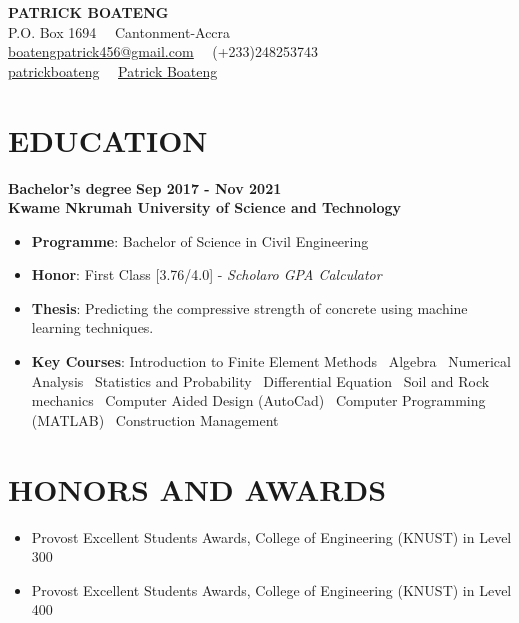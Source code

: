 \documentclass[letterpaper, 12pt]{article}
\newcommand{\cvsection}[1]{
	
	\section*{#1}
}
\newcommand{\verticalSpace}{4pt}
\newcommand{\itemizeMargin}{11pt}
\begin{document}
	
	
	\begin{center}
		
	{\huge{\textbf{PATRICK BOATENG}}} \\ [\verticalSpace]
	
	P.O. Box 1694 \, \vrule \, Cantonment-Accra \\ [\verticalSpace]
	
	\faEnvelope \space \href{mailto:boatengpatrick456@gmail.com}{\underline{boatengpatrick456@gmail.com}}
	\, \vrule \,
	\faPhone \space (+233)248253743 \\ [\verticalSpace]
	\faGithub \space \href{https://www.github.com/patrickboateng}{\underline{patrickboateng}}
	\, \vrule \,
	\faLinkedin \space \href{https://www.linkedin.com/in/patrickboateng}{\underline{Patrick Boateng}}
	
	\end{center}
	
	
	\cvsection{EDUCATION} 	
	
	\textbf{Bachelor's degree} \hfill \textbf{Sep 2017 - Nov 2021} \\ [\verticalSpace]
	\textbf{Kwame Nkrumah University of Science and Technology}
	
	\begin{itemize}[leftmargin=\itemizeMargin]
		
		\item \textbf{Programme}: Bachelor of Science in Civil Engineering
		\item \textbf{Honor}: First Class [3.76/4.0] - \textit{Scholaro GPA Calculator}
		\item \textbf{Thesis}: Predicting the compressive strength of concrete using machine learning techniques.
		\item \textbf{Key Courses}: Introduction to Finite Element Methods \vrule \, Algebra \vrule \, Numerical Analysis \vrule \, Statistics and Probability \vrule \, Differential Equation \vrule \, Soil and Rock mechanics \vrule \, Computer Aided Design (AutoCad) \vrule \, Computer Programming (MATLAB) \vrule \, Construction Management
	
	\end{itemize}
	
	
	\cvsection{HONORS AND AWARDS}
	
	\begin{itemize}[leftmargin=\itemizeMargin]
		
		\item Provost Excellent Students Awards, College of Engineering (KNUST) in Level 300
		\item Provost Excellent Students Awards, College of Engineering (KNUST) in Level 400
		
	\end{itemize}
	
\end{document}
